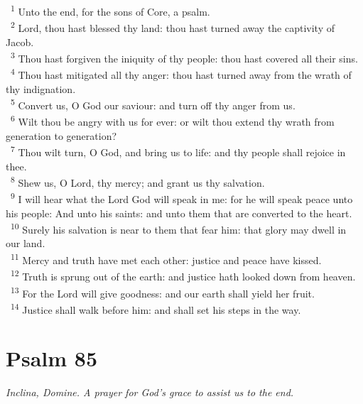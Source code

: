 \documentclass[a5paper,12pt]{article}
\begin{document}
\begin{multicols*}{2}
~\textsuperscript{1} Unto the end, for the sons of Core, a psalm.\\
~\textsuperscript{2} Lord, thou hast blessed thy land: thou hast turned away the captivity of Jacob.\\
~\textsuperscript{3} Thou hast forgiven the iniquity of thy people: thou hast covered all their sins.\\
~\textsuperscript{4} Thou hast mitigated all thy anger: thou hast turned away from the wrath of thy indignation.\\
~\textsuperscript{5} Convert us, O God our saviour: and turn off thy anger from us.\\
~\textsuperscript{6} Wilt thou be angry with us for ever: or wilt thou extend thy wrath from generation to generation?\\
~\textsuperscript{7} Thou wilt turn, O God, and bring us to life: and thy people shall rejoice in thee.\\
~\textsuperscript{8} Shew us, O Lord, thy mercy; and grant us thy salvation.\\
~\textsuperscript{9} I will hear what the Lord God will speak in me: for he will speak peace unto his people: And unto his saints: and unto them that are converted to the heart.\\
~\textsuperscript{10} Surely his salvation is near to them that fear him: that glory may dwell in our land.\\
~\textsuperscript{11} Mercy and truth have met each other: justice and peace have kissed.\\
~\textsuperscript{12} Truth is sprung out of the earth: and justice hath looked down from heaven.\\
~\textsuperscript{13} For the Lord will give goodness: and our earth shall yield her fruit.\\
~\textsuperscript{14} Justice shall walk before him: and shall set his steps in the way.\\

\section{Psalm 85}
\label{sec:orgaa388d9}
\emph{Inclina, Domine. A prayer for God's grace to assist us to the end.}\\


\end{multicols*}
\end{document}
